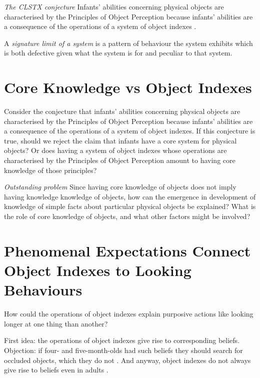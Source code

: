 \documentclass[12pt]{extarticle}
\begin{document}
\begin{multicols}{3}
\emph{The CLSTX conjecture}
Infants’ abilities concerning physical objects are
characterised by the Principles of Object Perception because infants’ abilities
are a consequence of the operations of a system of object indexes
\citep{Leslie:1998zk,Scholl:1999mi,Carey:2001ue,scholl:2007_objecta}.

A \emph{{signature limit} of a system} is a pattern of behaviour the system exhibits which is
both defective given what the system is for and peculiar to that system.



\section{Core Knowledge vs Object Indexes}

Consider the conjecture that infants’ abilities concerning physical objects are
characterised by the Principles of Object Perception because infants’ abilities
are a consequence of the operations of a system of object indexes.
If this conjecture is true, should we reject the claim that infants have a core
system for physical objects?
Or does having a system of object indexes whose operations are characterised by the Principles of
Object Perception amount to having core knowledge of those principles?

\emph{Outstanding problem}
Since having core knowledge of objects does not imply having knowledge knowledge of objects, how
can the emergence in development of knowledge of simple facts about particular physical objects be
explained?
What is the role of core knowledge of objects, and what other factors might be involved?



\section{Phenomenal Expectations Connect Object Indexes to Looking Behaviours}

How could the operations of object indexes explain purposive actions like looking longer at one
thing than another?

First idea: the operations of object indexes give rise to corresponding beliefs.
Objection: if four- and five-month-olds had such beliefs they should search for occluded objects,
which they do not \citep[e.g.][]{Shinskey:2001fk,moore:2008_factors}.
And anyway, object indexes do not always give rise to beliefs even in adults \citep{Mitroff:2004pc}.


\end{multicols}
\end{document}
